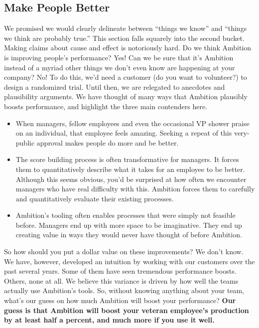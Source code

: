 \documentclass[paper=a4, fontsize=11pt abstract]{scrartcl}
\numberwithin{equation}{section}		%
\numberwithin{figure}{section}			%
\numberwithin{table}{section}				%
\begin{document}
\subsection{Make People Better}
We promised we would clearly delineate between ``things we know'' and ``things we think are probably true.''
This section falls squarely into the second bucket.
Making claims about cause and effect is notoriously hard.
Do we think Ambition is improving people's performance?  Yes!
Can we be sure that it's Ambition instead of a myriad other things we don't even know are happening at your company?  No!
To do this, we'd need  a customer (do you want to volunteer?) to design a randomized trial.
Until then, we are relegated to anecdotes and plausibility arguments.
We have thought of many ways that Ambition plausibly boosts performance, and highlight the three main contenders here.
\begin{itemize}
    \item When managers, fellow employees and even the occasional VP shower praise on an individual, that employee feels amazing.
    Seeking a repeat of this very-public approval makes people do more and be better.
    
    \item The score building process is often transformative for managers.
    It forces them to quantitatively describe what it takes for an employee to be better.
    Although this seems obvious, you'd be surprised at how often we encounter managers who have real difficulty with this.
    Ambition forces them to carefully and quantitatively evaluate their existing processes.
    
    \item Ambition's tooling often enables processes that were simply not feasible before.
    Managers end up with more space to be imaginative.
    They end up creating value in ways they would never have thought of before Ambition.
\end{itemize}

So how should you put a dollar value on these improvements?
We don't know.
We have, however, developed an intuition by working with our customers over the past several years.
Some of them have seen tremendous performance boosts.
Others, none at all.
We believe this variance is driven by how well the teams actually use Ambition's tools.
So, without knowing anything about your team, what's our guess on how much Ambition will boost your performance?
\textbf{Our guess is that Ambition will boost your veteran employee's production by at least half a percent, and much more if you use it well.}
\end{document}
